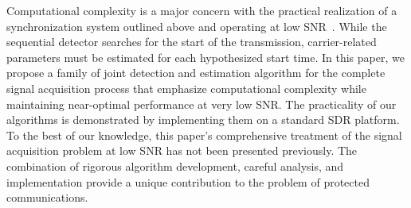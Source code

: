 Computational complexity is a major concern with the practical
realization of a synchronization system outlined above and operating at low SNR~\cite{murin_16,wang_21}.
While the sequential detector searches for the start of the
transmission, carrier-related parameters must be estimated for each
hypothesized start time. In this paper,
we propose a family of joint detection and estimation algorithm 
for the complete signal acquisition process
that emphasize computational complexity while maintaining near-optimal
performance at very low SNR.
The practicality of our algorithms is demonstrated by implementing
them on a standard SDR platform.
To the best of our knowledge, this paper's comprehensive treatment of the signal
acquisition problem at low SNR has not been presented previously.
The combination of rigorous algorithm development, careful analysis,
and implementation provide a unique contribution to the problem of
protected communications.




